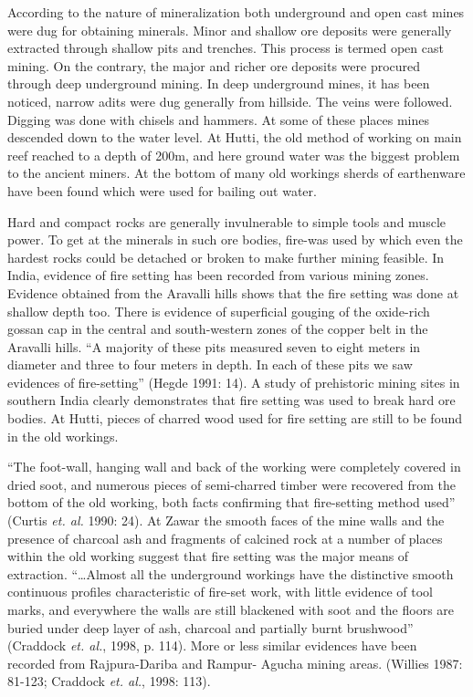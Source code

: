 \vspace{-.2cm}

According to the nature of mineralization both underground and open cast mines were dug for obtaining minerals. Minor and shallow ore deposits were generally extracted through shallow pits and trenches. This process is termed open cast mining. On the contrary, the major and richer ore deposits were procured through deep underground mining. In deep underground mines, it has been noticed, narrow adits were dug generally from hillside. The veins were followed. Digging was done with chisels and hammers. At some of these places mines descended down to the water level.  At Hutti, the old method of working on main reef reached to a depth of 200m, and here ground water was the biggest problem to the ancient miners. At the bottom of many old workings sherds of earthenware have been found which were used for bailing out water. 


Hard and compact rocks are generally invulnerable to simple tools and muscle power. To get at the minerals in such ore bodies, fire-was used by which even the hardest rocks could be detached or broken to make further mining feasible. In India, evidence of fire setting has been recorded from various mining zones. Evidence obtained from the Aravalli hills shows that the fire setting was done at shallow depth too. There is evidence of superficial gouging of the oxide-rich gossan cap in the central and south-western zones of the copper belt in the Aravalli hills. “A majority of these pits measured seven to eight meters in diameter and three to four meters in depth. In each of these pits we saw evidences of fire-setting” (Hegde 1991: 14). A study of prehistoric mining sites in southern India clearly demonstrates that fire setting was used to break hard ore bodies. At Hutti, pieces of charred wood used for fire setting are still to be found in the old workings. 

“The foot-wall, hanging wall and back of the working were completely covered in dried soot, and numerous pieces of semi-charred timber were recovered from the bottom of the old working, both facts confirming that fire-setting method used” (Curtis {\it et. al.} 1990: 24). At Zawar the smooth faces of the mine walls and the presence of charcoal ash and fragments of calcined rock at a number of places within the old working suggest that fire setting was the major means of extraction. “…Almost all the underground workings have the distinctive smooth continuous profiles characteristic of fire-set work, with little evidence of tool marks, and everywhere the walls are still blackened with soot and the floors are buried under deep layer of ash, charcoal and partially burnt brushwood” (Craddock {\it et. al.}, 1998, p. 114). More or less similar evidences have been recorded from Rajpura-Dariba and Rampur- Agucha mining areas. (Willies 1987: 81-123; Craddock {\it et. al.}, 1998: 113).

